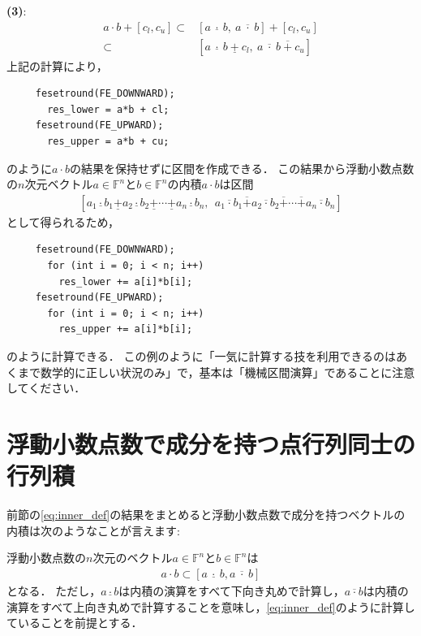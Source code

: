 \medskip\noindent\textbf{(3)}:
\begin{align*}
	a \cdot b + [ c_l, c_u ] \subset& [ a ~ \underline{\cdot} ~ b, ~ a ~ \overline{\cdot} ~ b  ] + [ c_l, c_u ] \\
	\subset& [ a ~ \underline{\cdot} ~ b ~ \underline{+} ~ c_l , ~ a ~ \overline{\cdot} ~ b ~ \overline{+} ~ c_u  ]
\end{align*}
上記の計算により，
\begin{verbatim}
     fesetround(FE_DOWNWARD);
       res_lower = a*b + cl;
     fesetround(FE_UPWARD);
       res_upper = a*b + cu;
\end{verbatim}
のように$a \cdot b$の結果を保持せずに区間を作成できる．
この結果から浮動小数点数の$n$次元ベクトル$a \in {\mathbb F}^n$と$b \in {\mathbb F}^n$の内積$a \cdot b$は区間
\begin{align}\label{eq:inner_def}
	[ a_1 \underline{\cdot} b_1 \underline{+} a_2 \underline{\cdot} b_2 \underline{+} \cdots \underline{+}  a_n \underline{\cdot} b_n, ~~ a_1 \overline{\cdot} b_1 \overline{+} a_2 \overline{\cdot} b_2 \overline{+} \cdots \overline{+}  a_n \overline{\cdot} b_n ]
\end{align}
として得られるため，
\begin{verbatim}
     fesetround(FE_DOWNWARD);
       for (int i = 0; i < n; i++)
         res_lower += a[i]*b[i];
     fesetround(FE_UPWARD);
       for (int i = 0; i < n; i++)
         res_upper += a[i]*b[i];
\end{verbatim}
のように計算できる．
この例のように「一気に計算する技を利用できるのはあくまで数学的に正しい状況のみ」で，基本は「機械区間演算」であることに注意してください．

%
\section{浮動小数点数で成分を持つ点行列同士の行列積}
前節の\eqref{eq:inner_def}の結果をまとめると浮動小数点数で成分を持つベクトルの内積は次のようなことが言えます:

\begin{Thm}[浮動小数点数における内積の包含] \label{thm:float_inner}
	浮動小数点数の$n$次元のベクトル$a \in {\mathbb F}^n$と$b \in {\mathbb F}^n$は
	\begin{align*}
		a \cdot b \subset [ a ~ \underline{\cdot} ~ b , a ~ \overline{\cdot} ~ b ]
	\end{align*}
	となる．
	ただし，$a \underline{\cdot} b$は内積の演算をすべて下向き丸めで計算し，$a \overline{\cdot} b$は内積の演算をすべて上向き丸めで計算することを意味し，\eqref{eq:inner_def}のように計算していることを前提とする．
\end{Thm}

